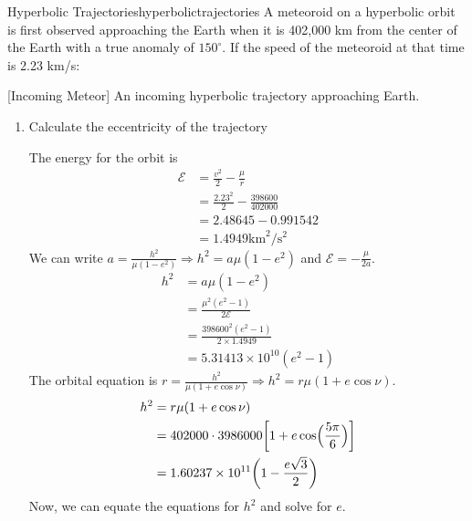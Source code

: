 \begin{examples}{Hyperbolic Trajectories}{hyperbolictrajectories}
  A meteoroid on a hyperbolic orbit is first observed approaching the Earth when
  it is 402,000 km from the center of the Earth with a true anomaly of
  \(150^{\circ}\).
  If the speed of the meteoroid at that time is 2.23 km/s:
  \par\smallskip
  \begin{minipage}{\linewidth}
    \centering
    
    [Incoming Meteor]
    {An incoming hyperbolic trajectory approaching Earth.}
    \label{incomingmeteoroid}
  \end{minipage}
  \begin{enumerate}[label = (\alph*)]
  \item
    Calculate the eccentricity of the trajectory
    \par\smallskip
    The energy for the orbit is
    \begin{align*} 
      \mathcal{E} & = \frac{v^2}{2} - \frac{\mu}{r}\\
                  & = \frac{2.23^2}{2} - \frac{398600}{402000}\\
                  & = 2.48645 - 0.991542\\
                  & = 1.4949\text{km}^2/\text{s}^2
    \end{align*}
    We can write \(a = \frac{h^2}{\mu(1 - e^2)}\Rightarrow h^2 =
    a\mu(1 - e^2)\) and \(\mathcal{E} = -\frac{\mu}{2a}\).
    \begin{align*} 
      h^2 & = a\mu(1 - e^2)\\
          & = \frac{\mu^2(e^2 - 1)}{2\mathcal{E}}\\
          & = \frac{398600^2(e^2 - 1)}{2\times 1.4949}\\
          & = 5.31413\times 10^{10}(e^2 - 1)
    \end{align*}
    The orbital equation is
    \(r = \frac{h^2}{\mu(1 + e\cos\nu)}\Rightarrow h^2 = r\mu(1 + e\cos\nu)\).
    \begin{align*} 
      h^2 & = r\mu(1 + e\cos\nu)\\
          & = 402000\cdot 3986000\biggl[1 + e
            \cos\Bigl(\frac{5\pi}{6}\Bigr)\biggr]\\
          & = 1.60237\times 10^{11}\biggl(1 - \frac{e\sqrt{3}}{2}\biggr)
    \end{align*}
    Now, we can equate the equations for \(h^2\) and solve for \(e\).  
    \begin{align*} 

\end{align*}
\end{enumerate}
\end{examples}
